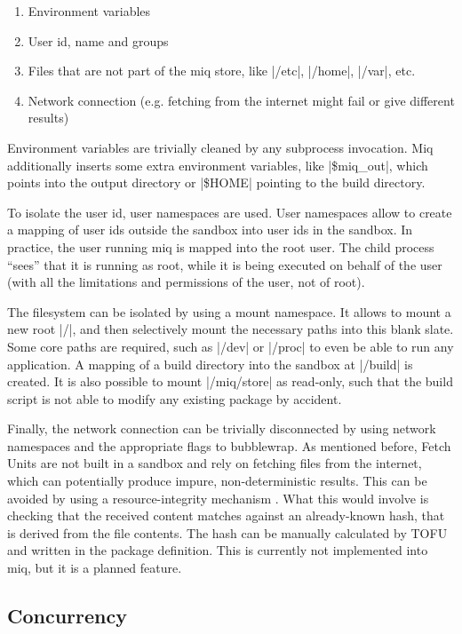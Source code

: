 \begin{enumerate}
    \item Environment variables
    \item User id, name and groups
    \item Files that are not part of the miq store, like
    |/etc|, |/home|, |/var|, etc.
    \item Network connection (e.g. fetching from the
    internet might fail or give different results)
\end{enumerate}

Environment variables are trivially cleaned by any
subprocess invocation. Miq additionally inserts some extra
environment variables, like |\$miq_out|, which points into
the output directory or |\$HOME| pointing to the build
directory.

To isolate the user id, user namespaces are used. User
namespaces allow to create a mapping of user ids outside the
sandbox into user ids in the sandbox. In practice, the user
running miq is mapped into the root user. The child process
``sees'' that it is running as root, while it is being
executed on behalf of the user (with all the limitations and
permissions of the user, not of root).

The filesystem can be isolated by using a mount namespace.
It allows to mount a new root |/|,
and then selectively mount the necessary paths into this
blank slate. Some core paths are required, such as |/dev| or
|/proc| to even be able to run any application. A mapping of
a build directory into the sandbox at |/build| is created.
It is also possible to mount |/miq/store| as read-only, such
that the build script is not able to modify any existing
package by accident.

Finally, the network connection can be trivially
disconnected by using network namespaces and the appropriate
flags to bubblewrap. As mentioned before, Fetch Units are
not built in a sandbox and rely on fetching files from the
internet, which can potentially produce impure,
non-deterministic results. This can be avoided by using a
resource-integrity mechanism
\cite{chapuisEmpiricalStudyUse2020} . What this would
involve is checking that the received content matches
against an already-known hash, that is derived from the file
contents. The hash can be manually calculated by \acl{TOFU}
and written in the package definition. This is currently not
implemented into miq, but it is a planned feature.

\FloatBarrier
\subsection{Concurrency}
\label{sec:concurrency}

